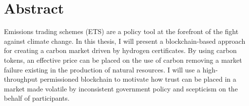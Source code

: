 \chapter*{Abstract}\label{abstract}
Emissions trading schemes (ETS) are a policy tool at the forefront of the fight against climate change. In this thesis, I will present a blockchain-based approach for creating a carbon market driven by hydrogen certificates. By using carbon tokens, an effective price can be placed on the use of carbon removing a market failure existing in the production of natural resources. I will use a high-throughput permissioned blockchain to motivate how trust can be placed in a market made volatile by inconsistent government policy and scepticism on the behalf of participants. 


